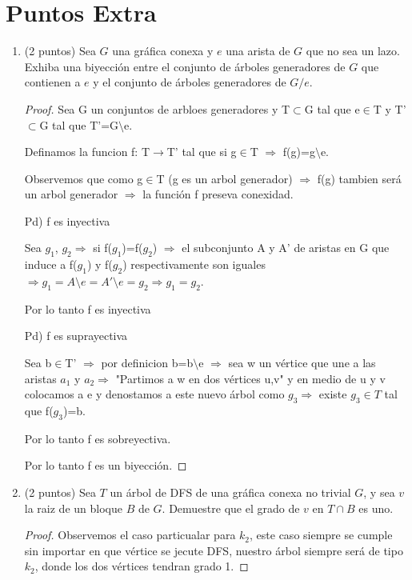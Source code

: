 \documentclass{article}
\begin{document}
\section*{Puntos Extra}
\begin{enumerate}
\item (2 puntos) Sea $G$ una gr\'afica conexa y $e$ una arista de $G$ que
  no sea un lazo. Exhiba una biyecci\'on entre el conjunto de \'arboles
  generadores de $G$ que contienen a $e$ y el conjunto de \'arboles
  generadores de $G / e$.


  \begin{proof} 

    Sea G un conjuntos de arbloes generadores y T$\subset$G tal que e$\in$T y T'$\subset$G tal que T'=G$\setminus$e.
    
    Definamos la funcion f: T$\rightarrow$T' tal que si g$\in$T  $\Longrightarrow$ f(g)=g$\setminus$e.
    
    
    Observemos que como g$\in$T (g es un arbol generador) $\Longrightarrow$ f(g) tambien será un arbol generador $\Longrightarrow$ la función f preseva conexidad.
    
    Pd) f es inyectiva 
    
    Sea $g_1$, $g_2 \Longrightarrow$ si f($g_1$)=f($g_2$) $\Longrightarrow$ el subconjunto A y A' de aristas en G que induce a f($g_1$) y f($g_2$) respectivamente son iguales $\Longrightarrow g_1=A\setminus e=A'\setminus e=g_2 \Longrightarrow g_1=g_2$.
    
    Por lo tanto f es inyectiva
    
    Pd) f es suprayectiva
    
    Sea b$\in$T' $\Longrightarrow$ por definicion b=b$\setminus$e $\Longrightarrow$ sea w un vértice que une a las aristas $a_1$ y $a_2 \Longrightarrow$ "Partimos a w en dos vértices u,v" y en medio de u y v colocamos a e y denostamos a este nuevo árbol como $g_3 \Longrightarrow$ existe $g_3 \in T$ tal que f($g_3$)=b.
    
    Por lo tanto f es sobreyectiva.
    
    Por lo tanto f es un biyección.
    
    \end{proof}

\item (2 puntos) Sea $T$ un \'arbol de DFS de una gr\'afica conexa no
  trivial $G$, y sea $v$ la raiz de un bloque $B$ de $G$.   Demuestre
  que el grado de $v$ en $T \cap B$ es uno.


  \begin{proof} 
    Observemos el caso particualar para $k_2$, este caso siempre se cumple sin importar en que vértice se jecute DFS, nuestro árbol siempre será de tipo $k_2$, donde los dos vértices tendran grado 1.
    

\end{proof}
\end{enumerate}
\end{document}
